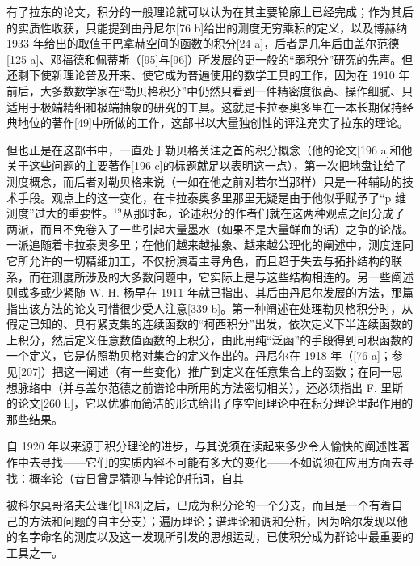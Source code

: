 有了拉东的论文，积分的一般理论就可以认为在其主要轮廓上已经完成；作为其后的实质性收获，只能提到由丹尼尔{[}76 b{]}给出的测度无穷乘积的定义，以及博赫纳 1933 年给出的取值于巴拿赫空间的函数的积分{[}24 a{]}，后者是几年后由盖尔范德{[}125 a{]}、邓福德和佩蒂斯（{[}95{]}与{[}96{]}）所发展的更一般的“弱积分”研究的先声。但还剩下使新理论普及开来、使它成为普遍使用的数学工具的工作，因为在 1910 年前后，大多数数学家在“勒贝格积分”中仍然只看到一件精密度很高、操作细腻、只适用于极端精细和极端抽象的研究的工具。这就是卡拉泰奥多里在一本长期保持经典地位的著作{[}49{]}中所做的工作，这部书以大量独创性的评注充实了拉东的理论。

但也正是在这部书中，一直处于勒贝格关注之首的积分概念（他的论文{[}196 a{]}和他关于这些问题的主要著作{[}196 c{]}的标题就足以表明这一点），第一次把地盘让给了测度概念，而后者对勒贝格来说（一如在他之前对若尔当那样）只是一种辅助的技术手段。观点上的这一变化，在卡拉泰奥多里那里无疑是由于他似乎赋予了“p 维测度”过大的重要性。\(^{19}\)从那时起，论述积分的作者们就在这两种观点之间分成了两派，而且不免卷入了一些引起大量墨水（如果不是大量鲜血的话）之争的论战。一派追随着卡拉泰奥多里；在他们越来越抽象、越来越公理化的阐述中，测度连同它所允许的一切精细加工，不仅扮演着主导角色，而且趋于失去与拓扑结构的联系，而在测度所涉及的大多数问题中，它实际上是与这些结构相连的。另一些阐述则或多或少紧随 W. H. 杨早在 1911 年就已指出、其后由丹尼尔发展的方法，那篇指出该方法的论文可惜很少受人注意{[}339 b{]}。第一种阐述在处理勒贝格积分时，从假定已知的、具有紧支集的连续函数的“柯西积分”出发，依次定义下半连续函数的上积分，然后定义任意数值函数的上积分，由此用纯“泛函”的手段得到可积函数的一个定义，它是仿照勒贝格对集合的定义作出的。丹尼尔在 1918 年（{[}76 a{]}；参见{[}207{]}）把这一阐述（有一些变化）推广到定义在任意集合上的函数；在同一思想脉络中（并与盖尔范德之前谱论中所用的方法密切相关），还必须指出 F. 里斯的论文{[}260 h{]}，它以优雅而简洁的形式给出了序空间理论中在积分理论里起作用的那些结果。

自 1920 年以来源于积分理论的进步，与其说须在读起来多少令人愉快的阐述性著作中去寻找——它们的实质内容不可能有多大的变化——不如说须在应用方面去寻找：概率论（昔日曾是猜测与悖论的托词，自其

被科尔莫哥洛夫公理化{[}183{]}之后，已成为积分论的一个分支，而且是一个有着自己的方法和问题的自主分支）；遍历理论；谱理论和调和分析，因为哈尔发现以他的名字命名的测度以及这一发现所引发的思想运动，已使积分成为群论中最重要的工具之一。
